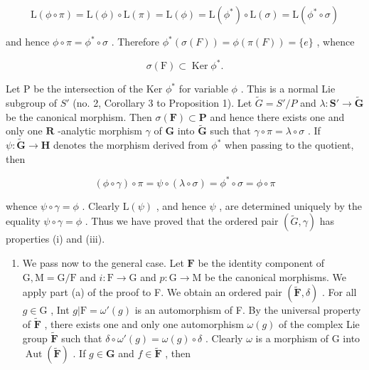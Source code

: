 \[
\mathrm{L} (\phi \circ \pi) = \mathrm{L} (\phi) \circ \mathrm{L} (\pi) = \mathrm{L} (\phi) = \mathrm{L} (\phi^ {*}) \circ \mathrm{L} (\sigma) = \mathrm{L} (\phi^ {*} \circ \sigma)
\]

and hence \(\phi \circ \pi = \phi^{*} \circ \sigma\) . Therefore \(\phi^{*}(\sigma(F)) = \phi(\pi(F)) = \{e\}\) , whence

\[
\sigma (\mathrm{F}) \subset \operatorname{Ker} \phi^ {*}.
\]

Let P be the intersection of the Ker \(\phi^{*}\) for variable \(\phi\) . This is a normal Lie subgroup of \(S'\) (no. 2, Corollary 3 to Proposition 1). Let \(\tilde{G} = S'/P\) and \(\lambda: \mathbf{S}' \to \tilde{\mathbf{G}}\) be the canonical morphism. Then \(\sigma(\mathbf{F}) \subset \mathbf{P}\) and hence there exists one and only one \(\mathbf{R}\) -analytic morphism \(\gamma\) of \(\mathbf{G}\) into \(\tilde{\mathbf{G}}\) such that \(\gamma \circ \pi = \lambda \circ \sigma\) . If \(\psi: \tilde{\mathbf{G}} \to \mathbf{H}\) denotes the morphism derived from \(\phi^*\) when passing to the quotient, then

\[
(\phi \circ \gamma) \circ \pi = \psi \circ (\lambda \circ \sigma) = \phi^ {*} \circ \sigma = \phi \circ \pi
\]

whence \(\psi \circ \gamma = \phi\) . Clearly \(\mathrm{L}(\psi)\) , and hence \(\psi\) , are determined uniquely by the equality \(\psi \circ \gamma = \phi\) . Thus we have proved that the ordered pair \((\tilde{G}, \gamma)\) has properties (i) and (iii).

\begin{enumerate}
\def\labelenumi{(\alph{enumi})}
\setcounter{enumi}{1}
\tightlist
\item
  We pass now to the general case. Let \(\mathbf{F}\) be the identity component of \(\mathrm{G},\mathrm{M} = \mathrm{G} / \mathrm{F}\) and \(i\colon \mathrm{F}\to \mathrm{G}\) and \(p\colon \mathrm{G}\rightarrow \mathrm{M}\) be the canonical morphisms. We apply part (a) of the proof to F. We obtain an ordered pair \((\tilde{\mathbf{F}},\delta)\) . For all \(g\in \mathrm{G}\) , Int \(g|\mathrm{F} = \omega '(g)\) is an automorphism of F. By the universal property of \(\tilde{\mathbf{F}}\) , there exists one and only one automorphism \(\omega (g)\) of the complex Lie group \(\tilde{\mathbf{F}}\) such that \(\delta \circ \omega '(g) = \omega (g)\circ \delta\) . Clearly \(\omega\) is a morphism of G into \(\operatorname {Aut}(\tilde{\mathbf{F}})\) . If \(g\in \mathbf{G}\) and \(f\in \tilde{\mathbf{F}}\) , then
\end{enumerate}

